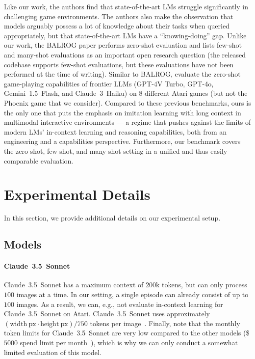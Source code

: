 \documentclass{article}
\newcommand{\eg}{e.g., }
\newcommand{\claude}{Claude~3.5~Sonnet}
\newcommand{\flash}{Gemini~1.5~Flash}
\newcommand{\gpt}{GPT-4o}
\begin{document}
Like our work, the authors find that state-of-the-art LMs struggle significantly in challenging game environments.
The authors also make the observation that models arguably possess a lot of knowledge about their tasks when queried appropriately, but that state-of-the-art LMs have a ``knowing-doing'' gap.
Unlike our work, the BALROG paper performs zero-shot evaluation and lists few-shot and many-shot evaluations as an important open research question (the released codebase supports few-shot evaluations, but these evaluations have not been performed at the time of writing).
Similar to BALROG, \citet{waytowich2024atari} evaluate the zero-shot game-playing capabilities of frontier LLMs (GPT-4V Turbo, \gpt, \flash{}, and Claude~$3$~Haiku) on $8$ different Atari games (but not the Phoenix game that we consider).
Compared to these previous benchmarks, ours is the only one that puts the emphasis on imitation learning with long context in multimodal interactive environments --- a regime that pushes against the limits of modern LMs' in-context learning and reasoning capabilities, both from an engineering and a capabilities perspective.
Furthermore, our benchmark covers the zero-shot, few-shot, and many-shot setting in a unified and thus easily comparable evaluation.
    \section{Experimental Details}
\label{app:experimental-details}
In this section, we provide additional details on our experimental setup.
\subsection{Models}
\label{app:experimental-details:models}
\paragraph{\claude{}}
\claude{} has a maximum context of $200$k tokens, but can only process $100$ images at a time. In our setting, a single episode can already consist of up to $100$ images.
As a result, we can, \eg not evaluate in-context learning for \claude{} on Atari.
\claude{} uses approximately $(\mathrm{width~px} \cdot \mathrm{height~px}) / 750$ tokens per image~\citep{anthropic2024vision}.
Finally, note that the monthly token limits for \claude{} are very low compared to the other models (\$$5000$ spend limit per month~\citep{anthropic2024rate}), which is why we can only conduct a somewhat limited evaluation of this model.
\end{document}
